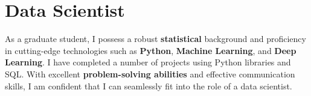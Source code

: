 
\section{Data Scientist}
\small{
    As a graduate student, I possess a robust \textbf{statistical} background and proficiency in cutting-edge technologies such as \textbf{Python}, \textbf{Machine Learning}, and \textbf{Deep Learning}. I have completed a number of projects using Python libraries and SQL. With excellent \textbf{problem-solving abilities} and effective communication skills, I am confident that I can seamlessly fit into the role of a data scientist.
}